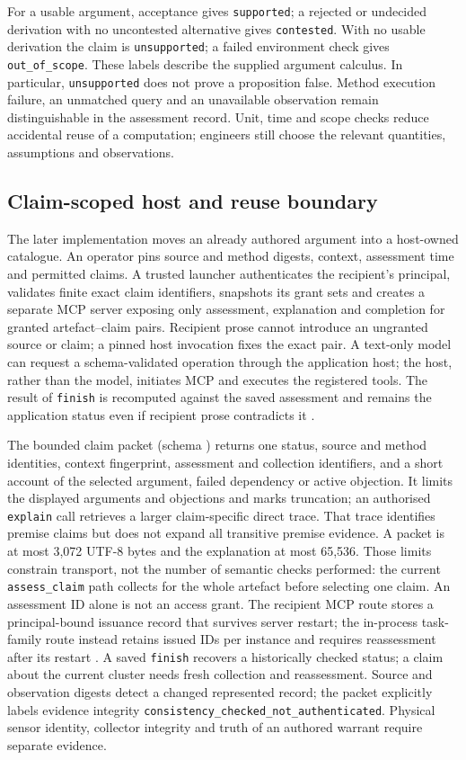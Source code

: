 \documentclass[preprint,12pt]{elsarticle}
\begin{document}
For a usable argument, acceptance gives \texttt{supported}; a rejected or undecided derivation with no uncontested alternative gives \texttt{contested}. With no usable derivation the claim is \texttt{unsupported}; a failed environment check gives \texttt{out\_of\_scope}. These labels describe the supplied argument calculus. In particular, \texttt{unsupported} does not prove a proposition false. Method execution failure, an unmatched query and an unavailable observation remain distinguishable in the assessment record. Unit, time and scope checks reduce accidental reuse of a computation; engineers still choose the relevant quantities, assumptions and observations.

\subsection{Claim-scoped host and reuse boundary}\label{sec:host}
The later implementation moves an already authored argument into a host-owned catalogue. An operator pins source and method digests, context, assessment time and permitted claims. A trusted launcher authenticates the recipient's principal, validates finite exact claim identifiers, snapshots its grant sets and creates a separate MCP server exposing only assessment, explanation and completion for granted artefact--claim pairs. Recipient prose cannot introduce an ungranted source or claim; a pinned host invocation fixes the exact pair. A text-only model can request a schema-validated operation through the application host; the host, rather than the model, initiates MCP and executes the registered tools. The result of \texttt{finish} is recomputed against the saved assessment and remains the application status even if recipient prose contradicts it \citep{earlHost}.

The bounded claim packet (schema ) returns one status, source and method identities, context fingerprint, assessment and collection identifiers, and a short account of the selected argument, failed dependency or active objection. It limits the displayed arguments and objections and marks truncation; an authorised \texttt{explain} call retrieves a larger claim-specific direct trace. That trace identifies premise claims but does not expand all transitive premise evidence. A packet is at most 3,072 UTF-8 bytes and the explanation at most 65,536. Those limits constrain transport, not the number of semantic checks performed: the current \texttt{assess\_claim} path collects for the whole artefact before selecting one claim. An assessment ID alone is not an access grant. The recipient MCP route stores a principal-bound issuance record that survives server restart; the in-process task-family route instead retains issued IDs per instance and requires reassessment after its restart \citep{earlHost,earlFamilyHost}. A saved \texttt{finish} recovers a historically checked status; a claim about the current cluster needs fresh collection and reassessment. Source and observation digests detect a changed represented record; the packet explicitly labels evidence integrity \texttt{consistency\_checked\_not\_authenticated}. Physical sensor identity, collector integrity and truth of an authored warrant require separate evidence.
\end{document}
